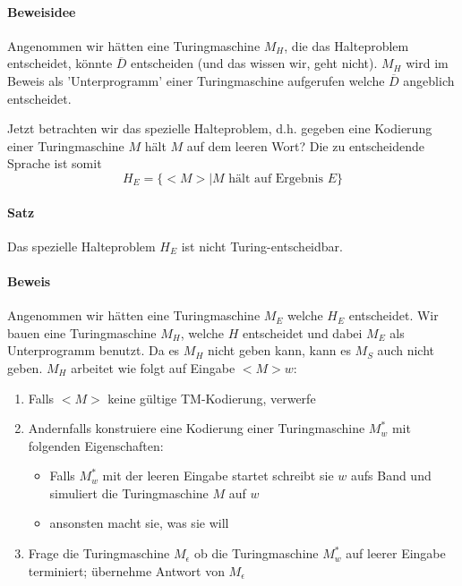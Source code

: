 \paragraph*{Beweisidee} Angenommen wir hätten eine Turingmaschine $M_H$, die das Halteproblem entscheidet, könnte $\overline{D}$ entscheiden (und das wissen wir, geht nicht). $M_H$ wird im Beweis als 'Unterprogramm' einer Turingmaschine aufgerufen welche $\overline{D}$ angeblich entscheidet.

\para{} Jetzt betrachten wir das spezielle Halteproblem, d.h. gegeben eine Kodierung einer Turingmaschine $M$
hält $M$ auf dem leeren Wort? Die zu entscheidende Sprache ist somit $$ H_E = \{ <M> | M \text{ hält auf Ergebnis }  E \} $$

\paragraph*{Satz} Das spezielle Halteproblem $H_E$ ist nicht Turing-entscheidbar.

\paragraph*{Beweis} Angenommen wir hätten eine Turingmaschine $M_E$ welche $H_E$ entscheidet. Wir bauen eine Turingmaschine $M_H$, welche $H$ entscheidet und dabei $M_E$ als Unterprogramm benutzt. Da es $M_H$ nicht geben kann, kann es $M_S$ auch nicht geben. $M_H$ arbeitet wie folgt auf Eingabe $<M>w$:
\begin{enumerate}
	\item Falls $<M>$ keine gültige TM-Kodierung, verwerfe
	\item Andernfalls konstruiere eine Kodierung einer Turingmaschine $M_w^*$ mit folgenden Eigenschaften:
	\begin{itemize}
		\item Falls $M_w^*$ mit der leeren Eingabe startet schreibt sie $w$ aufs Band und simuliert die Turingmaschine $M$ auf $w$
		\item ansonsten macht sie, was sie will
	\end{itemize}
	\item Frage die Turingmaschine $M_\epsilon$ ob die Turingmaschine $M_w^*$ auf leerer Eingabe terminiert; übernehme Antwort von $M_\epsilon$
\end{enumerate}

